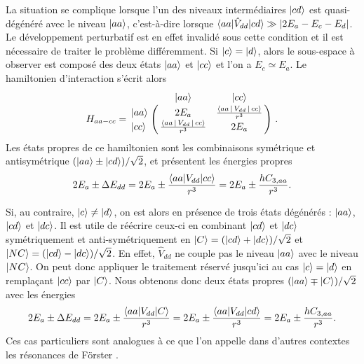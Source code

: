 La situation se complique lorsque l'un des niveaux intermédiaires $\ket{cd}$ est quasi-dégénéré avec le niveau $\ket{aa}$, c'est-à-dire lorsque $\braket{aa|\hat{V}_{dd}|cd} \gg |2E_a-E_c-E_d|$.
Le développement perturbatif est en effet invalidé sous cette condition et il est nécessaire de traiter le problème différemment.
Si $\ket{c}=\ket{d}$, alors le sous-espace à observer est composé des deux états $\ket{aa}$ et $\ket{cc}$ et l'on a $E_c\simeq E_a$.
Le hamiltonien d'interaction s'écrit alors
\begin{equation}\label{eq:forster_aacc}
H_{aa-cc} = \bordermatrix{~ 	&\ket{aa} 	& \ket{cc} \cr
	\ket{aa}		&2E_a 		& \frac{\Braket{aa|V_{dd}|cc}}{r^3}	\cr 
	\ket{cc} 		& \frac{\Braket{aa|V_{dd}|cc}}{r^3} 		&2E_a\cr} \ .
\end{equation}
%
Les états propres de ce hamiltonien sont les combinaisons symétrique et antisymétrique $(\ket{aa}\pm\ket{cd})/\sqrt{2}$, et présentent les énergies propres
\begin{equation}\label{eq:forster_aacc_energies}
2E_a \pm \Delta E_{dd} = 2E_a \pm\frac{\braket{aa|V_{dd}|cc}}{r^3}= 2E_a \pm\frac{hC_{3,aa}}{r^3}.
\end{equation}

Si, au contraire, $\ket{c}\neq \ket{d}$, on est alors en présence de trois états dégénérés : $\ket{aa}$, $\ket{cd}$ et $\ket{dc}$.
Il est utile de réécrire ceux-ci en combinant $\ket{cd}$ et $\ket{dc}$ symétriquement et anti-symétriquement en $\ket{C}=(\ket{cd}+\ket{dc})/\sqrt{2}$ et $\ket{NC}=(\ket{cd}-\ket{dc})/\sqrt{2}$.
En effet, $\hat{V}_{dd}$ ne couple pas le niveau $\ket{aa}$ avec le niveau $\ket{NC}$.
On peut donc appliquer le traitement réservé jusqu'ici au cas $\ket{c}=\ket{d}$ en remplaçant $\ket{cc}$ par $\ket{C}$.
Nous obtenons donc deux états propres $(\ket{aa}\mp \ket{C})/\sqrt{2}$ avec les énergies
\begin{equation}\label{eq:forster_aacd_energies}
2E_a \pm \Delta E_{dd} = 2E_a \pm\frac{\braket{aa|V_{dd}|C}}{r^3}= 2E_a \pm\frac{\braket{aa|V_{dd}|cd}}{r^3}= 2E_a \pm\frac{hC_{3,aa}}{r^3}.
\end{equation}
Ces cas particuliers sont analogues à ce que l'on appelle dans d'autres contextes les résonances de Förster \cite{MX_BROWAEYSDD14}.

